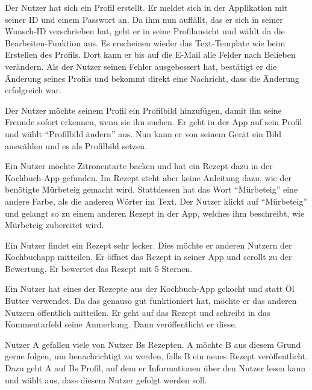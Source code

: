 Der Nutzer hat sich ein Profil erstellt. Er meldet sich in der Applikation mit seiner ID und einem Passwort an. Da ihm nun auffällt, das er sich in seiner Wunsch-ID verschrieben hat, geht er in seine \gls{Profilansicht} und wählt da die Bearbeiten-Funktion aus. Es erscheinen wieder das Text-\gls{Template} wie beim Erstellen des Profils. Dort kann er bis auf die E-Mail alle Felder nach Belieben verändern. Als der Nutzer seinen Fehler ausgebessert hat, bestätigt er die Änderung seines Profils und bekommt direkt eine Nachricht, dass die Änderung erfolgreich war.

Der Nutzer möchte seinem Profil ein Profilbild hinzufügen, damit ihn seine Freunde sofort erkennen, wenn sie ihn suchen. Er geht in der App auf sein Profil und wählt "`Profilbild ändern"' aus. Nun kann er von seinem Gerät ein Bild auswählen und es als Profilbild setzen.
		
Ein Nutzer möchte Zitronentarte backen und hat ein Rezept dazu in der Kochbuch-App gefunden. Im Rezept steht aber keine Anleitung dazu, wie der benötigte Mürbeteig gemacht wird. Stattdessen hat das Wort "`Mürbeteig"' eine andere Farbe, als die anderen Wörter im Text. Der Nutzer klickt auf "`Mürbeteig"' und gelangt so zu einem anderen Rezept in der App, welches ihm beschreibt, wie Mürbeteig zubereitet wird.

Ein Nutzer findet ein Rezept sehr lecker. Dies möchte er anderen Nutzern der Kochbuchapp mitteilen. Er öffnet das Rezept in seiner App und scrollt zu der Bewertung. Er bewertet das Rezept mit 5 Sternen.
		
Ein Nutzer hat eines der Rezepte aus der Kochbuch-App gekocht und statt Öl Butter verwendet. Da das genauso gut funktioniert hat, möchte er das anderen Nutzern öffentlich mitteilen. Er geht auf das Rezept und schreibt in das Kommentarfeld seine Anmerkung. Dann veröffentlicht er diese.
		
 Nutzer A gefallen viele von Nutzer Bs Rezepten. A möchte B aus diesem Grund gerne folgen, um benachrichtigt zu werden, falls B ein neues Rezept veröffentlicht. Dazu geht A auf Bs Profil, auf dem er Informationen über den Nutzer lesen kann und wählt aus, dass diesem Nutzer gefolgt werden soll.
		

